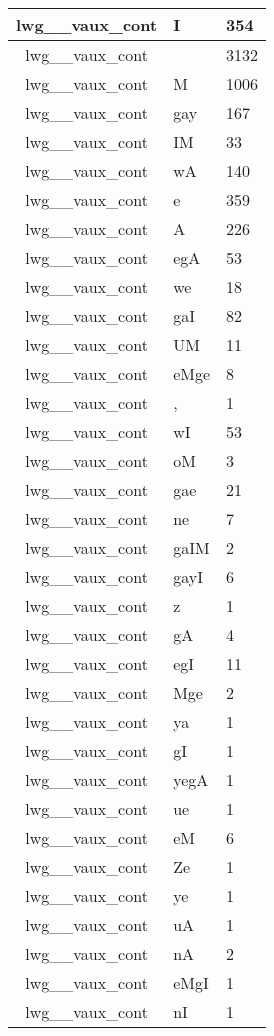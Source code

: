 \documentclass[a4 paper]{article}
\begin{document}
\begin{longtable}{cp{}p{}}
lwg\_\_vaux\_cont & I & 354\\ \midrule lwg\_\_vaux\_cont &  & 3132\\ \midrule lwg\_\_vaux\_cont & M & 1006\\ \midrule lwg\_\_vaux\_cont & gay & 167\\ \midrule lwg\_\_vaux\_cont & IM & 33\\ \midrule lwg\_\_vaux\_cont & wA & 140\\ \midrule lwg\_\_vaux\_cont & e & 359\\ \midrule lwg\_\_vaux\_cont & A & 226\\ \midrule lwg\_\_vaux\_cont & egA & 53\\ \midrule lwg\_\_vaux\_cont & we & 18\\ \midrule lwg\_\_vaux\_cont & gaI & 82\\ \midrule lwg\_\_vaux\_cont & UM & 11\\ \midrule lwg\_\_vaux\_cont & eMge & 8\\ \midrule lwg\_\_vaux\_cont & , & 1\\ \midrule lwg\_\_vaux\_cont & wI & 53\\ \midrule lwg\_\_vaux\_cont & oM & 3\\ \midrule lwg\_\_vaux\_cont & gae & 21\\ \midrule lwg\_\_vaux\_cont & ne & 7\\ \midrule lwg\_\_vaux\_cont & gaIM & 2\\ \midrule lwg\_\_vaux\_cont & gayI & 6\\ \midrule lwg\_\_vaux\_cont & z & 1\\ \midrule lwg\_\_vaux\_cont & gA & 4\\ \midrule lwg\_\_vaux\_cont & egI & 11\\ \midrule lwg\_\_vaux\_cont & Mge & 2\\ \midrule lwg\_\_vaux\_cont & ya & 1\\ \midrule lwg\_\_vaux\_cont & gI & 1\\ \midrule lwg\_\_vaux\_cont & yegA & 1\\ \midrule lwg\_\_vaux\_cont & ue & 1\\ \midrule lwg\_\_vaux\_cont & eM & 6\\ \midrule lwg\_\_vaux\_cont & Ze & 1\\ \midrule lwg\_\_vaux\_cont & ye & 1\\ \midrule lwg\_\_vaux\_cont & uA & 1\\ \midrule lwg\_\_vaux\_cont & nA & 2\\ \midrule lwg\_\_vaux\_cont & eMgI & 1\\ \midrule lwg\_\_vaux\_cont & nI & 1\\ \midrule 

\end{longtable}
\end{document}

